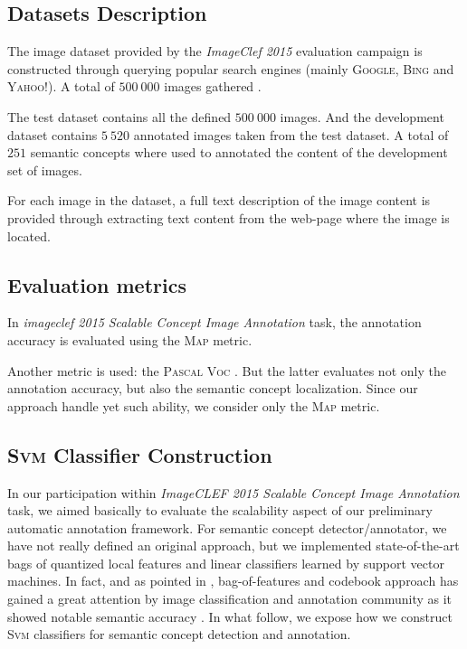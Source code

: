 		\subsection{Datasets Description}
			The image dataset provided by the \textit{ImageClef 2015} evaluation campaign is 
			constructed through querying popular search engines (mainly \textsc{Google}, \textsc{Bing} 
			and \textsc{Yahoo!}). A total of $500~000$ images  gathered \citep{Gilbert2015}.

			The test dataset contains all the defined $500~000$ images. And the development dataset 
			contains $5~520$ annotated images taken from the test dataset. A total of $251$ semantic
			concepts where used to annotated the content of the development set of images.

			For each image in the dataset, a full text description of the image content is 
			provided through extracting text content from the web-page where the image is located.

		\subsection{Evaluation metrics}
			In \textit{imageclef 2015} \textit{Scalable Concept Image Annotation} task, the annotation 
			accuracy is evaluated using the \textsc{Map} metric.
			
			Another metric is used: the \textsc{Pascal Voc} \citep{Everingham2015}. But the 
			latter evaluates not only the annotation accuracy, but also the semantic 
			concept localization. Since our approach  handle yet such  ability, 
			we consider only the \textsc{Map} metric.


		\subsection{\textsc{Svm} Classifier Construction}
			In our participation within \textit{ImageCLEF 2015 Scalable Concept Image Annotation} task,
			we aimed basically to evaluate the scalability aspect of our preliminary automatic annotation 
			framework. For semantic concept detector/annotator, we have not really defined an original approach, 
			but we implemented state-of-the-art bags of quantized local features and linear 
			classifiers learned by support vector machines. In fact, and as pointed in \cite{Piras2014}, 
			bag-of-features and codebook approach has 
			gained a great attention by image classification and annotation community 
			as it showed notable semantic accuracy 
			\citep{Jurie2005,Gemert2008,Mylonas2009,Ngo2010,Grana2013,Hidaka2013,Kanehira2014,Xu2014,Elleuch2015}.
			In what follow, we expose how we construct \textsc{Svm} classifiers for semantic concept detection and annotation.

